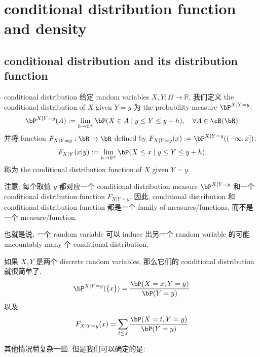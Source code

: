 \section{conditional distribution function and density}
\subsection{conditional distribution and its distribution function}
\begin{definition}{conditional distribution}
给定 random variables \(X, Y: \Omega \to \mathbb{R}\), 
我们定义 the conditional distribution of \(X\) given \(Y = y\) 
为 the probability measure \(\bP^{X|Y=y}\):
\[
\bP^{X|Y=y}(A) := \lim_{h\to 0^+} \bP(X \in A \mid y \leq Y \leq y+h),\quad \forall A \in \cB(\bR)
\]
并将 function \(F_{X|Y=y}: \bR \to \bR\) defined by \(F_{X|Y=y}(x) := \bP^{X|Y=y}((-\infty, x])\):
\[
F_{X|Y}(x|y) := \lim_{h\to 0^+} \bP(X\leq x \mid y \leq Y \leq y+h)
\]
称为 the conditional distribution function of \(X\) given \(Y=y\).
\end{definition}
\begin{remark}
注意: 每个取值 \(y\) 都对应一个 conditional distribution measure \(\bP^{X|Y=y}\) 
和一个 conditional distribution function \(F_{X|Y=y}\).
因此, conditional distribution 和 conditional distribution function 都是一个 family of measures/functions,
而不是一个 measure/function.

也就是说, 一个 random variable 可以 induce 出另一个 random variable 的可能 uncountably many 个 conditional distribution.
\end{remark}

\begin{remark}
    如果 \(X,Y\) 是两个 discrete random variables, 那么它们的 conditional distribution 就很简单了.
    \[
    \bP^{X|Y=y}(\{x\}) = \frac{\bP(X=x, Y=y)}{\bP(Y=y)}
    \]
    以及
    \[
    F_{X|Y=y}(x) = \sum_{t\leq x} \frac{\bP(X=t, Y=y)}{\bP(Y=y)}
    \]

    其他情况稍复杂一些. 但是我们可以确定的是:
\end{remark}

